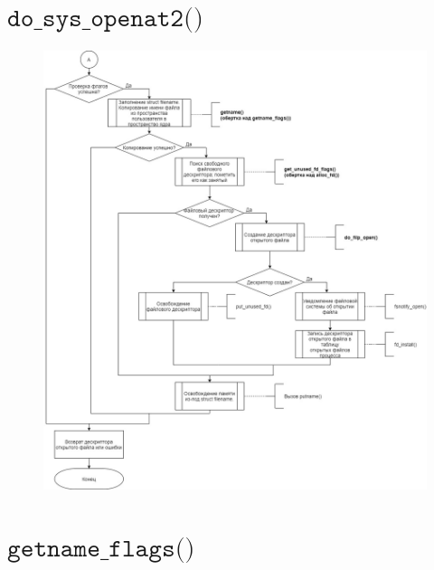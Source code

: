 \documentclass[a4paper,14pt]{extreport}
\begin{document}
\section{$\texttt{do\_sys\_openat2()}$}
\begin{figure}[H]
	\centering
	\includegraphics[scale=0.45]{img/open2.jpg}
\end{figure}







\section{$\texttt{getname\_flags()}$}
\end{document}
